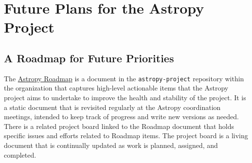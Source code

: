 \documentclass[modern]{aastex631}
\newcommand{\secauthor}[1]{{\color{blue}Author:~\textit{#1}}}
\begin{document}

\section{Future Plans for the Astropy Project} \label{sec:future}

\subsection{A Roadmap for Future Priorities}

The
\href{https://github.com/astropy/astropy-project/blob/main/roadmap/roadmap.md}{Astropy Roadmap} is a document in the \texttt{astropy-project} \github
repository within the \astropy organization that captures high-level actionable
items that the Astropy project aims to undertake to improve the health and
stability of the project. It is a static document that is revisited regularly at
the Astropy coordination meetings, intended to keep track of progress and write
new versions as needed. There is a related project board linked to the Roadmap
document that holds specific issues and efforts related to Roadmap items. The
project board is a living document that is continually updated as work is
planned, assigned, and completed.
\end{document}
